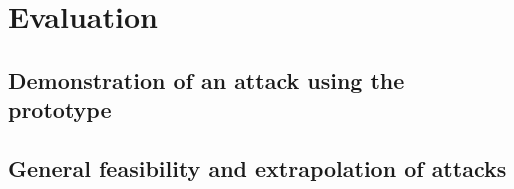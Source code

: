 \chapter{Evaluation}
\label{chapter:evaluation}

\section{Demonstration of an attack using the prototype}

\section{General feasibility and extrapolation of attacks}
